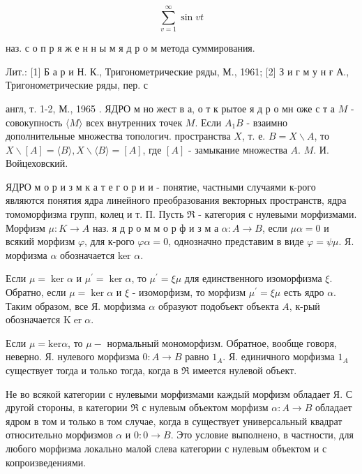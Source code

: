 \documentclass[10pt]{article}
\begin{document}
\[

\sum_{v=1}^{\infty} \sin v t

\]



наз. с о п р я ж е н н ы м я д р о м метода суммирования.



Лит.: [1] Б а р и Н. К., Тригонометрические ряды, М., 1961; [2] З и г м у н ғ А., Тригонометрические ряды, пер. с

англ, т. 1-2, М., 1965 . ЯДРО м но жест в а, о т к рытое я д р о мн оже с т а $M$ - совокупность $\langle M\rangle$ всех внутренних точек $M$. Если $A_{1} B$ - взаимно дополнительные множества топологич. пространства $X$, т. е. $B=X \backslash A$, то $X \backslash[A]=\langle B\rangle, X \backslash\langle B\rangle=[A]$, где $[A]$ - замыкание множества $A$. $M$. И. Войцеховский.



ЯДРО м о р и з м к а т е г о р и и - понятие, частными случаями к-рого являются понятия ядра линейного преобразования векторных пространств, ядра томоморфизма групп, колец и т. П. Пусть $\Re$ - категория с нулевыми морфизмами. Морфизм $\mu: K \rightarrow A$ наз. я д р о м м о р ф и з м а $\alpha: A \rightarrow B$, если $\mu \alpha=0$ и всякий морфизм $\varphi$, для к-рого $\varphi \alpha=0$, однозначно представим в виде $\varphi=\psi \mu$. Я. морфизма $\alpha$ обозначается ker $\alpha$.



Если $\mu=\operatorname{ker} \alpha$ и $\mu^{\prime}=\operatorname{ker} \alpha$, то $\mu^{\prime}=\xi \mu$ для единственного изоморфизма $\xi$. Обратно, если $\mu=\operatorname{ker} \alpha$ и $\xi$ - изоморфизм, то морфизм $\mu^{\prime}=\xi \mu$ есть ядро $\alpha$. Таким образом, все Я. морфизма $\alpha$ образуют подобъект объекта $A$, к-рыӥ обозначается $\mathrm{K} \operatorname{er} \alpha$.



Если $\mu=\mathrm{ker} \alpha$, то $\mu-$ нормальный мономорфизм. Обратное, вообще говоря, неверно. Я. нулевого морфизма $0: A \rightarrow B$ равно $1_{A}$. Я. единичного морфизма $1_{A}$ существует тогда и только тогда, когда в $\mathfrak{\Re}$ имеется нулевой объект.



Не во всякой категории с нулевыми морфизмами каждый морфизм обладает Я. С другой стороны, в категории $\Re$ с нулевым объектом морфизм $\alpha: A \rightarrow B$ обладает ядром в том и только в том случае, когда в существует универсальный квадрат относительно морфизмов $\alpha$ и $0: 0 \rightarrow B$. Это условие выполнено, в частности, для любого морфизма локально малой слева категории с нулевым объектом и с копроизведениями.
\end{document}
